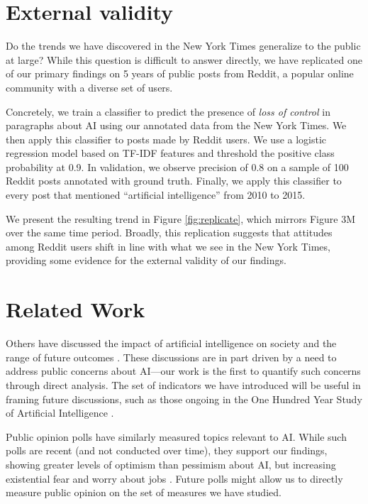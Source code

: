 \documentclass[letterpaper]{article}
\begin{document}
\section{External validity}

Do the trends we have discovered in the New York Times generalize to the public at large? While this question is difficult to answer directly, we have replicated one of our primary findings on 5 years of public posts from Reddit, a popular online community with a diverse set of users.

Concretely, we train a classifier to predict the presence of \textit{loss of control} in paragraphs about AI using our annotated data from the New York Times. We then apply this classifier to posts made by Reddit users. We use a logistic regression model based on TF-IDF features and threshold the positive class probability at 0.9. In validation, we observe precision of 0.8 on a sample of 100 Reddit posts annotated with ground truth. Finally, we apply this classifier to every post that mentioned ``artificial intelligence'' from 2010 to 2015.

We present the resulting trend in Figure \ref{fig:replicate}, which mirrors Figure 3M over the same time period. Broadly, this replication suggests that attitudes among Reddit users shift in line with what we see in the New York Times, providing some evidence for the external validity of our findings.

\section{Related Work}

Others have discussed the impact of artificial intelligence on society and the range of future outcomes \cite{ai-concerns}. These discussions are in part driven by a need to address public concerns about AI---our work is the first to quantify such concerns through direct analysis. The set of indicators we have introduced will be useful in framing future discussions, such as those ongoing in the One Hundred Year Study of Artificial Intelligence \cite{100years}.

Public opinion polls have similarly measured topics relevant to AI. While such polls are recent (and not conducted over time), they support our findings, showing greater levels of optimism than pessimism about AI, but increasing existential fear and worry about jobs \cite{bsa-poll,cbs-poll}. Future polls might allow us to directly measure public opinion on the set of measures we have studied.
\end{document}
